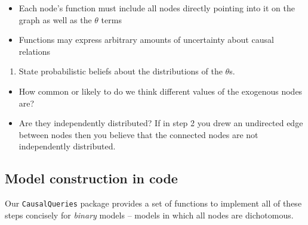 \documentclass[
  12pt,
]{book}
\providecommand{\tightlist}{%
  \setlength{\itemsep}{0pt}\setlength{\parskip}{0pt}}
\newenvironment{headerbox}{
  \definecolor{shadecolor}{rgb}{0.8, 0.8, 0.8}  %
  \color{black}
  \begin{shaded}}{\end{shaded}}
\begin{document}
\begin{headerbox}
\begin{itemize}
\tightlist
\item
  Each node's function must include all nodes directly pointing into it on the graph as well as the \(\theta\) terms
\item
  Functions may express arbitrary amounts of uncertainty about causal relations
\end{itemize}

\begin{enumerate}
\def\labelenumi{\arabic{enumi}.}
\setcounter{enumi}{3}
\tightlist
\item
  State probabilistic beliefs about the distributions of the \(\theta\)s.
\end{enumerate}

\begin{itemize}
\tightlist
\item
  How common or likely to do we think different values of the exogenous nodes are?
\item
  Are they independently distributed? If in step 2 you drew an undirected edge between nodes then you believe that the connected nodes are not independently distributed.
\end{itemize}

\end{headerbox}

\hypertarget{model-construction-in-code}{%
\subsection{Model construction in code}\label{model-construction-in-code}}

Our \texttt{CausalQueries} package provides a set of functions to implement all of these steps concisely for \emph{binary} models -- models in which all nodes are dichotomous.
\end{document}
